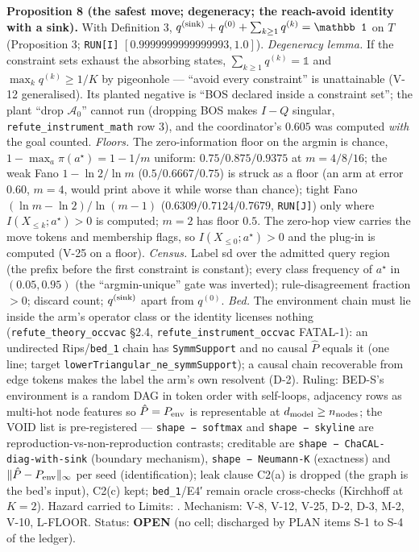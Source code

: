 \documentclass[11pt,a4paper]{article}
\theoremstyle{plain}
\theoremstyle{definition}
\theoremstyle{remark}
\begin{document}
\textbf{Proposition 8 (the safest move; degeneracy; the reach-avoid
identity with a sink).} With Definition 3,
\(q^{({\rm sink})}+q^{(0)}+\sum_{k\ge1}q^{(k)}=\mathbb 1\) on \(T\)
(Proposition 3; \texttt{RUN{[}I{]}} \([0.9999999999999993,1.0]\)).
\emph{Degeneracy lemma.} If the constraint sets exhaust the absorbing
states, \(\sum_{k\ge1}q^{(k)}=\mathbb 1\) and \(\max_kq^{(k)}\ge1/K\) by
pigeonhole --- ``avoid every constraint'' is unattainable (V-12
generalised). Its planted negative is ``BOS declared inside a constraint
set''; the plant ``drop \(\mathcal A_0\)'' cannot run (dropping BOS
makes \(I-Q\) singular, \texttt{refute\_instrument\_math} row 3), and
the coordinator's \(0.605\) was computed \emph{with} the goal counted.
\emph{Floors.} The zero-information floor on the argmin is chance,
\(1-\max_a\pi(a^\star)=1-1/m\) uniform: \(0.75/0.875/0.9375\) at
\(m=4/8/16\); the weak Fano \(1-\ln2/\ln m\) (\(0.5/0.6667/0.75\)) is
struck as a floor (an arm at error \(0.60\), \(m=4\), would print above
it while worse than chance); tight Fano \((\ln m-\ln2)/\ln(m-1)\)
(\(0.6309/0.7124/0.7679\), \texttt{RUN{[}J{]}}) only where
\(I(X_{\le k};a^\star)>0\) is computed; \(m=2\) has floor \(0.5\). The
zero-hop view carries the move tokens and membership flags, so
\(I(X_{\le0};a^\star)>0\) and the plug-in is computed (V-25 on a floor).
\emph{Census.} Label sd over the admitted query region (the prefix
before the first constraint is constant); every class frequency of
\(a^\star\) in \((0.05,0.95)\) (the ``argmin-unique'' gate was
inverted); rule-disagreement fraction \(>0\); discard count;
\(q^{({\rm sink})}\) apart from \(q^{(0)}\). \emph{Bed.} The environment
chain must lie inside the arm's operator class or the identity licenses
nothing (\texttt{refute\_theory\_occvac} §2.4,
\texttt{refute\_instrument\_occvac} FATAL-1): an undirected
Rips/\texttt{bed\_1} chain has \texttt{SymmSupport} and no causal
\(\hat P\) equals it (one line; target
\texttt{lowerTriangular\_ne\_symmSupport}); a causal chain recoverable
from edge tokens makes the label the arm's own resolvent (D-2). Ruling:
BED-S's environment is a random DAG in token order with self-loops,
adjacency rows as multi-hot node features so \(\hat P=P_{\rm env}\) is
representable at \(d_{\rm model}\ge n_{\rm nodes}\); the VOID list is
pre-registered --- \texttt{shape\ −\ softmax} and
\texttt{shape\ −\ skyline} are reproduction-vs-non-reproduction
contrasts; creditable are \texttt{shape\ −\ ChaCAL-diag-with-sink}
(boundary mechanism), \texttt{shape\ −\ Neumann-K} (exactness) and
\(\|\hat P-P_{\rm env}\|_\infty\) per seed (identification); leak clause
C2(a) is dropped (the graph is the bed's input), C2(c) kept;
\texttt{bed\_1}/E4′ remain oracle cross-checks (Kirchhoff at \(K=2\)).
Hazard carried to Limits: \citep{misra-2023-safety-constrained-mdp}.
Mechanism: V-8, V-12, V-25, D-2, D-3, M-2, V-10, L-FLOOR. Status:
\textbf{OPEN} (no cell; discharged by PLAN items S-1 to S-4 of the
ledger).
\end{document}
